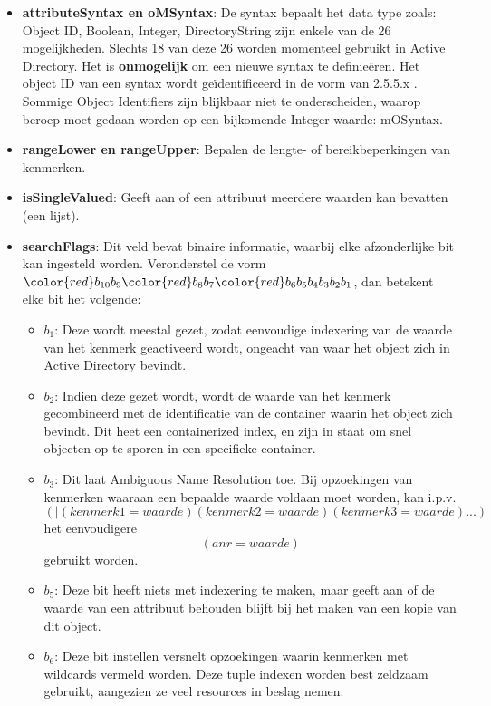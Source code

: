 \begin{enumerate}
		 { 
			\begin{itemize}
				\item \textbf{attributeSyntax en oMSyntax}: De syntax bepaalt het data type zoals: Object ID, Boolean, Integer, DirectoryString zijn enkele van de 26 mogelijkheden. Slechts 18 van deze 26 worden momenteel gebruikt in Active Directory. Het is \textbf{onmogelijk} om een nieuwe syntax te definieëren. Het object ID van een syntax wordt geïdentificeerd in de vorm van 2.5.5.x . Sommige Object Identifiers zijn blijkbaar niet te onderscheiden, waarop beroep moet gedaan worden op een bijkomende Integer waarde: mOSyntax.
				\item \textbf{rangeLower en rangeUpper}: Bepalen de lengte- of bereikbeperkingen van kenmerken.
				\item \textbf{isSingleValued}: Geeft aan of een attribuut meerdere waarden kan bevatten (een lijst).
				\item \textbf{searchFlags}: Dit veld bevat binaire informatie, waarbij elke afzonderlijke bit kan ingesteld worden. Veronderstel de vorm ${\color{red}b_{10}}b_9{\color{red}b_8}b_7{\color{red}b_6b_5b_4b_3b_2b_1}$, dan betekent elke bit het volgende:
				\begin{itemize}
					\item \textbf{$b_1$}: Deze wordt meestal gezet, zodat eenvoudige indexering van de waarde van het kenmerk geactiveerd wordt, ongeacht van waar het object zich in Active Directory bevindt.
					\item \textbf{$b_2$}: Indien deze gezet wordt, wordt de waarde van het kenmerk gecombineerd met de identificatie van de container waarin het object zich bevindt. Dit heet een containerized index, en zijn in staat om snel objecten op te sporen in een specifieke container.
					\item \textbf{$b_3$}: Dit laat Ambiguous Name Resolution toe. Bij opzoekingen van kenmerken waaraan een bepaalde waarde voldaan moet worden, kan i.p.v.  $$(\mid(kenmerk1=waarde)(kenmerk2=waarde)(kenmerk3=waarde)...)$$ het eenvoudigere $$(anr=waarde)$$ gebruikt worden. 
					\item \textbf{$b_5$}: Deze bit heeft niets met indexering te maken, maar geeft aan of de waarde van een attribuut behouden blijft bij het maken van een kopie van dit object.
					\item \textbf{$b_6$}: Deze bit instellen versnelt opzoekingen waarin kenmerken met wildcards vermeld worden. Deze tuple indexen worden best zeldzaam gebruikt, aangezien ze veel resources in beslag nemen.

\end{itemize}
\end{itemize}}
\end{enumerate}
